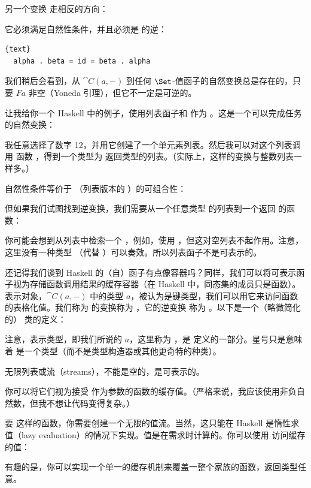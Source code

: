 另一个变换  走相反的方向：

它必须满足自然性条件，并且必须是  的逆：

\begin{lstlisting}{text}
  alpha . beta = id = beta . alpha
\end{lstlisting}
我们稍后会看到，从 $\cat{C}(a, -)$ 到任何 $\Set$-值函子的自然变换总是存在的，只要 $F a$ 非空（Yoneda 引理），但它不一定是可逆的。

让我给你一个 Haskell 中的例子，使用列表函子和  作为 。这是一个可以完成任务的自然变换：

我任意选择了数字 12，并用它创建了一个单元素列表。然后我可以对这个列表调用  函数 ，得到一个类型为  返回类型的列表。（实际上，这样的变换与整数列表一样多。）

自然性条件等价于 （列表版本的 ）的可组合性：

但如果我们试图找到逆变换，我们需要从一个任意类型  的列表到一个返回  的函数：

你可能会想到从列表中检索一个 ，例如，使用 ，但这对空列表不起作用。注意，这里没有一种类型 （代替 ）可以奏效。所以列表函子不是可表示的。

还记得我们谈到 Haskell 的（自）函子有点像容器吗？同样，我们可以将可表示函子视为存储函数调用结果的缓存容器（在 Haskell 中，同态集的成员只是函数）。表示对象，$\cat{C}(a, -)$ 中的类型 $a$，被认为是键类型，我们可以用它来访问函数的表格化值。我们称为  的变换称为 ，它的逆变换  称为 。以下是一个（略微简化的） 类的定义：

注意，表示类型，即我们所说的 $a$，这里称为 ，是  定义的一部分。星号只是意味着  是一个类型（而不是类型构造器或其他更奇特的种类）。

无限列表或流（streams），不能是空的，是可表示的。

你可以将它们视为接受  作为参数的函数的缓存值。（严格来说，我应该使用非负自然数，但我不想让代码变得复杂。）

要  这样的函数，你需要创建一个无限的值流。当然，这只能在 Haskell 是惰性求值（lazy evaluation）的情况下实现。值是在需求时计算的。你可以使用  访问缓存的值：

有趣的是，你可以实现一个单一的缓存机制来覆盖一整个家族的函数，返回类型任意。

